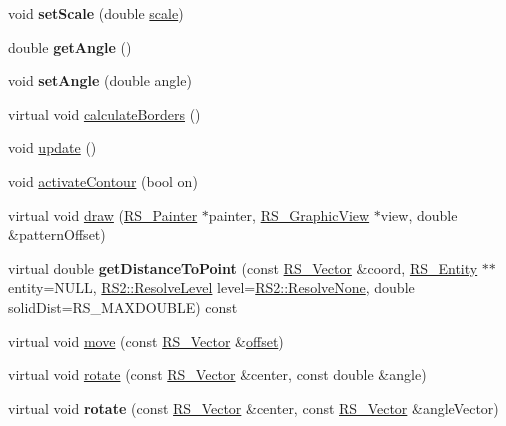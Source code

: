 \begin{DoxyCompactItemize}
\item 
\hypertarget{classRS__Hatch_a11661050877b5f4f1db2f33615bb77ae}{void {\bfseries set\-Scale} (double \hyperlink{classRS__Hatch_a248bf7c36b81652fda481e976dd62b09}{scale})}\label{classRS__Hatch_a11661050877b5f4f1db2f33615bb77ae}

\item 
\hypertarget{classRS__Hatch_ad01b3888c7a772b7c848eadc9d275685}{double {\bfseries get\-Angle} ()}\label{classRS__Hatch_ad01b3888c7a772b7c848eadc9d275685}

\item 
\hypertarget{classRS__Hatch_a9d6092c04f735c004e33230ea4e975ea}{void {\bfseries set\-Angle} (double angle)}\label{classRS__Hatch_a9d6092c04f735c004e33230ea4e975ea}

\item 
virtual void \hyperlink{classRS__Hatch_aace15e876d6f85e4adb799e5d079ee99}{calculate\-Borders} ()
\item 
void \hyperlink{classRS__Hatch_abc88cf985de2914662cdbbf0f0ee224f}{update} ()
\item 
void \hyperlink{classRS__Hatch_a98f6aa8cd6de0df790db6474911ed16d}{activate\-Contour} (bool on)
\item 
virtual void \hyperlink{classRS__Hatch_a09a7c4269f0aeff38763a767b07cd5ba}{draw} (\hyperlink{classRS__Painter}{R\-S\-\_\-\-Painter} $\ast$painter, \hyperlink{classRS__GraphicView}{R\-S\-\_\-\-Graphic\-View} $\ast$view, double \&pattern\-Offset)
\item 
\hypertarget{classRS__Hatch_a0661f2849d0b3bd08ea716607c89deb9}{virtual double {\bfseries get\-Distance\-To\-Point} (const \hyperlink{classRS__Vector}{R\-S\-\_\-\-Vector} \&coord, \hyperlink{classRS__Entity}{R\-S\-\_\-\-Entity} $\ast$$\ast$entity=N\-U\-L\-L, \hyperlink{classRS2_a1b2c5e3a3e9d1b03a9564229255faa20}{R\-S2\-::\-Resolve\-Level} level=\hyperlink{classRS2_a1b2c5e3a3e9d1b03a9564229255faa20aecb7396f39bc313ad8903c8a5fac5a50}{R\-S2\-::\-Resolve\-None}, double solid\-Dist=R\-S\-\_\-\-M\-A\-X\-D\-O\-U\-B\-L\-E) const }\label{classRS__Hatch_a0661f2849d0b3bd08ea716607c89deb9}

\item 
virtual void \hyperlink{classRS__Hatch_afdd3cb3f765d7ade1902da99d827103b}{move} (const \hyperlink{classRS__Vector}{R\-S\-\_\-\-Vector} \&\hyperlink{classRS__Entity_aa296d21b9aac99161d386ce2f60f0fea}{offset})
\item 
virtual void \hyperlink{classRS__Hatch_ac346cf4772acc2f7913fcfc189bb2348}{rotate} (const \hyperlink{classRS__Vector}{R\-S\-\_\-\-Vector} \&center, const double \&angle)
\item 
\hypertarget{classRS__Hatch_a429968660a186692e228896d499648e5}{virtual void {\bfseries rotate} (const \hyperlink{classRS__Vector}{R\-S\-\_\-\-Vector} \&center, const \hyperlink{classRS__Vector}{R\-S\-\_\-\-Vector} \&angle\-Vector)}\label{classRS__Hatch_a429968660a186692e228896d499648e5}


\end{DoxyCompactItemize}
